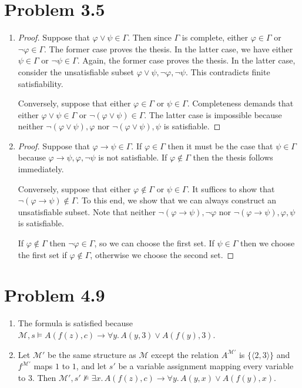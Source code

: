 \documentclass[a4paper]{article}
\begin{document}
\section{Problem 3.5}
\begin{enumerate}
\item
  \begin{proof}
    Suppose that $\varphi \vee \psi \in \Gamma$.
    Then since $\Gamma$ is complete, either $\varphi \in \Gamma$ or $\lnot \varphi \in \Gamma$.
    The former case proves the thesis.
    In the latter case, we have either $\psi \in \Gamma$ or $\lnot \psi \in \Gamma$.
    Again, the former case proves the thesis.
    In the latter case, consider the unsatisfiable subset $\varphi \vee \psi, \lnot \varphi, \lnot \psi$.
    This contradicts finite satisfiability.

    Conversely, suppose that either $\varphi \in \Gamma$ or $\psi \in \Gamma$.
    Completeness demands that either $\varphi \vee \psi \in \Gamma$ or $\lnot(\varphi \vee \psi) \in \Gamma$.
    The latter case is impossible because neither $\lnot(\varphi \vee \psi), \varphi$ nor $\lnot(\varphi \vee \psi), \psi$ is satisfiable.
  \end{proof}
\item
  \begin{proof}
    Suppose that $\varphi \to \psi \in \Gamma$.
    If $\varphi \in \Gamma$ then it must be the case that $\psi \in \Gamma$ because $\varphi \to \psi, \varphi, \lnot\psi$ is not satisfiable.
    If $\varphi \notin \Gamma$ then the thesis follows immediately.

    Conversely, suppose that either $\varphi \notin \Gamma$ or $\psi \in \Gamma$.
    It suffices to show that $\lnot(\varphi \to \psi) \notin \Gamma$.
    To this end, we show that we can always construct an unsatisfiable subset.
    Note that neither $\lnot(\varphi \to \psi), \lnot \varphi$ nor $\lnot(\varphi \to \psi), \varphi, \psi$ is satisfiable.

    If $\varphi \notin \Gamma$ then $\lnot\varphi \in \Gamma$, so we can choose the first set.
    If $\psi \in \Gamma$ then we choose the first set if $\varphi \notin \Gamma$, otherwise we choose the second set.
  \end{proof}
\end{enumerate}

\section{Problem 4.9}
\begin{enumerate}
\item The formula is satisfied because $\mathscr{M}, s \models A(f(z),c) \to \forall y.\,A(y,3) \vee A(f(y),3)$.
\item Let $\mathscr{M}'$ be the same structure as $\mathscr{M}$ except the relation $A^{\mathscr{M}'}$ is $\{\langle2,3\rangle\}$ and $f^{\mathscr{M}'}$ maps $1$ to $1$, and let $s'$ be a variable assignment mapping every variable to $3$.
  Then $\mathscr{M}',s' \nvDash \exists x.\,A(f(z),c) \to \forall y.\,A(y,x) \vee A(f(y),x)$.
\end{enumerate}
\end{document}
